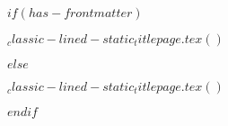 $if(has-frontmatter)$
  \begin{frontmatter}
    \begin{titlepage}
      $_classic-lined-static_titlepage.tex()$
    \end{titlepage}
  \end{frontmatter}
$else$
  \begin{titlepage}
    $_classic-lined-static_titlepage.tex()$
  \end{titlepage}
$endif$
